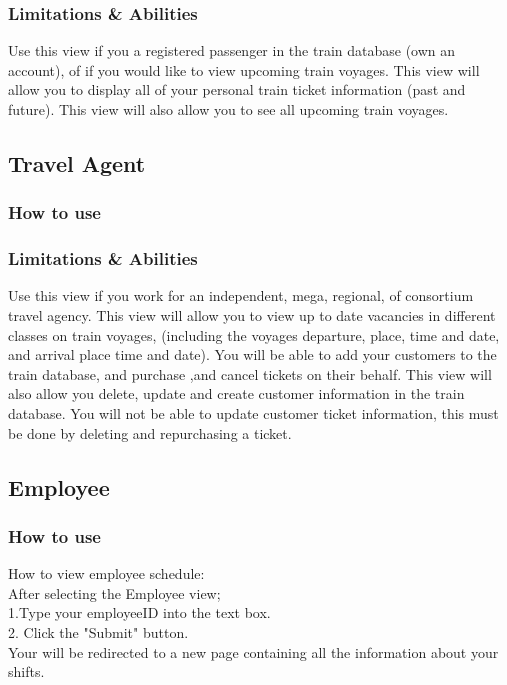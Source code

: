 \documentclass[letter]{article}
\begin{document}
\subsubsection{Limitations \& Abilities}
Use this view if you a registered passenger in the train database (own an account), of if you would like to view upcoming train voyages. This view will allow you to display all of your personal train ticket information (past and future).  This view will also allow you to see all upcoming train voyages.

\subsection{Travel Agent}
\subsubsection{How to use}

\subsubsection{Limitations \& Abilities}
Use this view if you work for an independent, mega, regional, of consortium travel agency. This view will allow you to view up to date vacancies in different classes on train voyages, (including the voyages departure, place, time and date, and arrival place time and date).  You will be able to add your customers to the train database, and purchase ,and cancel tickets on their behalf. This view will also allow you delete, update and create customer information in the train database. You will not be able to update customer ticket information, this must be done by deleting and repurchasing a ticket. 


\subsection{Employee}
\subsubsection{How to use}
How to view employee schedule:\\
After selecting the Employee view;\\ 
1.Type your employeeID into the text box.\\
2. Click the "Submit" button. \\
Your will be redirected to a new page containing all the information about your shifts. \\
\end{document}
